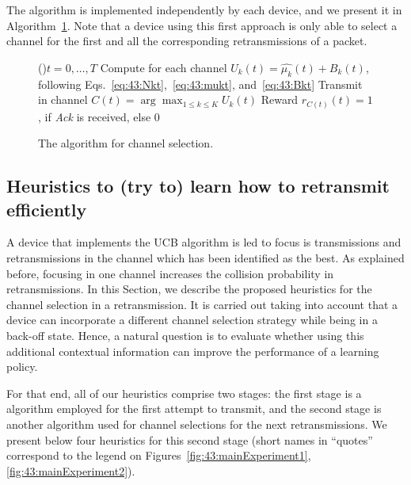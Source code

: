 The \UCB{} algorithm is implemented independently by each device, and we present it in Algorithm~\ref{algo:43:UCB}.
Note that a device using this first approach is only able to select a channel for the first and all the corresponding retransmissions of a packet.

\begin{figure}[h!]
	\centering
	\begin{algorithm}[H]
		\For(){$t = 0, \dots, T$}{
			Compute for each channel $ U_k(t) = \widehat{\mu_k}(t) + B_k(t)$, following Eqs.~\eqref{eq:43:Nkt},~\eqref{eq:43:mukt}, and~\eqref{eq:43:Bkt}\;
			Transmit in channel $C(t) = \arg\max_{1\leq k \leq K} U_k(t)$\;
			Reward $r_{C(t)}(t) = 1$, if \emph{Ack} is received, else $0$\;
		}
		\caption{The \UCB{} algorithm for channel selection.}
		\label{algo:43:UCB}
	\end{algorithm}
\end{figure}


\subsection{Heuristics to (try to) learn how to retransmit efficiently}
\label{sub:43:heuristics}

A device that implements the UCB algorithm is led to focus is transmissions and retransmissions in the channel which has been identified as the best.
As explained before, focusing in one channel increases the collision probability in retransmissions.
In this Section, we describe the proposed heuristics for the channel selection in a retransmission. It is carried out taking
into account that a device can incorporate a different channel selection strategy while being in a back-off state.
Hence, a natural question is to evaluate whether using this additional contextual information can improve the performance of a learning policy.

For that end, all of our heuristics comprise two stages:
the first stage is a \UCB{} algorithm employed for the first attempt to transmit,
and the second stage is another algorithm used for channel selections for the next retransmissions.
%
We present below four heuristics for this second stage (short names in ``quotes'' correspond to the legend on Figures~\ref{fig:43:mainExperiment1}, \ref{fig:43:mainExperiment2}).


